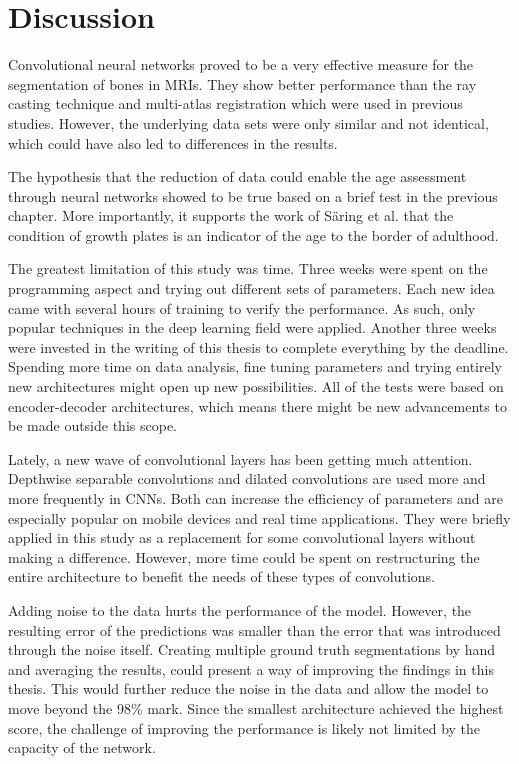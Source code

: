 \section{Discussion}

Convolutional neural networks proved to be a very effective measure for the segmentation of bones in MRIs. They show better performance than the ray casting technique and multi-atlas registration which were used in previous studies. However, the underlying data sets were only similar and not identical, which could have also led to differences in the results.

The hypothesis that the reduction of data could enable the age assessment through neural networks showed to be true based on a brief test in the previous chapter. More importantly, it supports the work of Säring et al. that the condition of growth plates is an indicator of the age to the border of adulthood.

The greatest limitation of this study was time. Three weeks were spent on the programming aspect and trying out different sets of parameters. Each new idea came with several hours of training to verify the performance. As such, only popular techniques in the deep learning field were applied. Another three weeks were invested in the writing of this thesis to complete everything by the deadline. Spending more time on data analysis, fine tuning parameters and trying entirely new architectures might open up new possibilities. All of the tests were based on encoder-decoder architectures, which means there might be new advancements to be made outside this scope.

Lately, a new wave of convolutional layers has been getting much attention. Depthwise separable convolutions and dilated convolutions are used more and more frequently in CNNs. Both can increase the efficiency of parameters and are especially popular on mobile devices and real time applications. They were briefly applied in this study as a replacement for some convolutional layers without making a difference. However, more time could be spent on restructuring the entire architecture to benefit the needs of these types of convolutions.

Adding noise to the data hurts the performance of the model. However, the resulting error of the predictions was smaller than the error that was introduced through the noise itself. Creating multiple ground truth segmentations by hand and averaging the results, could present a way of improving the findings in this thesis. This would further reduce the noise in the data and allow the model to move beyond the 98\% mark. Since the smallest architecture achieved the highest score, the challenge of improving the performance is likely not limited by the capacity of the network.

